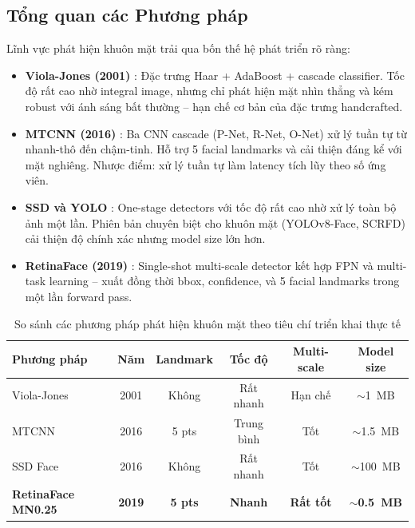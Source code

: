\subsection{Tổng quan các Phương pháp}
\label{subsec:face_detection_survey}

Lĩnh vực phát hiện khuôn mặt trải qua bốn thế hệ phát triển rõ ràng:

\begin{itemize}
    \item \textbf{Viola-Jones (2001)} \cite{ViolaJones2004}: Đặc trưng Haar + AdaBoost + cascade classifier. Tốc độ rất cao nhờ integral image, nhưng chỉ phát hiện mặt nhìn thẳng và kém robust với ánh sáng bất thường -- hạn chế cơ bản của đặc trưng handcrafted.

    \item \textbf{MTCNN (2016)} \cite{Zhang2016MTCNN}: Ba CNN cascade (P-Net, R-Net, O-Net) xử lý tuần tự từ nhanh-thô đến chậm-tinh. Hỗ trợ 5 facial landmarks và cải thiện đáng kể với mặt nghiêng. Nhược điểm: xử lý tuần tự làm latency tích lũy theo số ứng viên.

    \item \textbf{SSD và YOLO} \cite{Liu2016SSD, Redmon2016YOLO}: One-stage detectors với tốc độ rất cao nhờ xử lý toàn bộ ảnh một lần. Phiên bản chuyên biệt cho khuôn mặt (YOLOv8-Face, SCRFD) cải thiện độ chính xác nhưng model size lớn hơn.

    \item \textbf{RetinaFace (2019)} \cite{Deng2019RetinaFace}: Single-shot multi-scale detector kết hợp FPN và multi-task learning -- xuất đồng thời bbox, confidence, và 5 facial landmarks trong một lần forward pass.
\end{itemize}

\begin{table}[H]
\caption{So sánh các phương pháp phát hiện khuôn mặt theo tiêu chí triển khai thực tế}
\label{tab:face_detection_comparison}
\centering
\begin{tabular}{|l|c|c|c|c|c|}
\hline
\textbf{Phương pháp} & \textbf{Năm} & \textbf{Landmark} & \textbf{Tốc độ} & \textbf{Multi-scale} & \textbf{Model size} \\
\hline
Viola-Jones \cite{ViolaJones2004} & 2001 & Không & Rất nhanh & Hạn chế & $\sim$1~MB \\
\hline
MTCNN \cite{Zhang2016MTCNN} & 2016 & 5 pts & Trung bình & Tốt & $\sim$1.5~MB \\
\hline
SSD Face \cite{Liu2016SSD} & 2016 & Không & Rất nhanh & Tốt & $\sim$100~MB \\
\hline
\textbf{RetinaFace MN0.25} \cite{Deng2019RetinaFace} & \textbf{2019} & \textbf{5 pts} & \textbf{Nhanh} & \textbf{Rất tốt} & \textbf{$\sim$0.5~MB} \\
\hline
\end{tabular}
\end{table}


